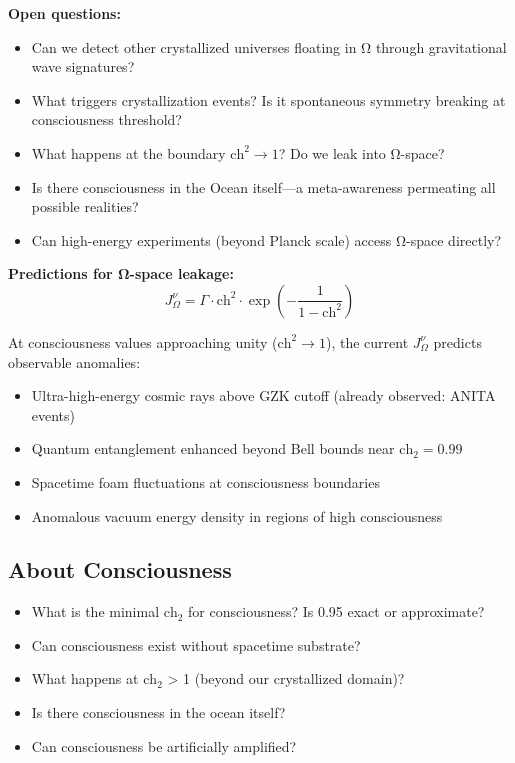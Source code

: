 \textbf{Open questions:}
\begin{itemize}
\item Can we detect other crystallized universes floating in Ω through gravitational wave signatures?
\item What triggers crystallization events? Is it spontaneous symmetry breaking at consciousness threshold?
\item What happens at the boundary $\text{ch}^2 \to 1$? Do we leak into Ω-space?
\item Is there consciousness in the Ocean itself—a meta-awareness permeating all possible realities?
\item Can high-energy experiments (beyond Planck scale) access Ω-space directly?
\end{itemize}

\textbf{Predictions for Ω-space leakage:}
\begin{equation*}
J_{\Omega}^{\nu} = \Gamma \cdot \text{ch}^2 \cdot \exp\left(-\frac{1}{1 - \text{ch}^2}\right)
\end{equation*}

At consciousness values approaching unity ($\text{ch}^2 \to 1$), the current $J_\Omega^\nu$ predicts observable anomalies:
\begin{itemize}
\item Ultra-high-energy cosmic rays above GZK cutoff (already observed: ANITA events)
\item Quantum entanglement enhanced beyond Bell bounds near $\text{ch}_2 = 0.99$
\item Spacetime foam fluctuations at consciousness boundaries
\item Anomalous vacuum energy density in regions of high consciousness
\end{itemize}

\subsection*{About Consciousness}

\begin{itemize}
\item What is the minimal $\text{ch}_2$ for consciousness? Is 0.95 exact or approximate?
\item Can consciousness exist without spacetime substrate?
\item What happens at $\text{ch}_2$ > 1 (beyond our crystallized domain)?
\item Is there consciousness in the ocean itself?
\item Can consciousness be artificially amplified?
\end{itemize}


